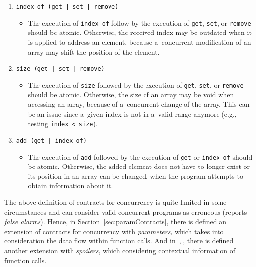 \begin{example}
\begin{enumerate}[label={$ (\varrho_{\arabic*}) $}]
        \item
            \texttt{index\_of (get | set | remove)}
            \begin{itemize}[label=]
                \item
                    The execution of \texttt{index\_of} follow by the execution
                    of \texttt{get}, \texttt{set}, or \texttt{remove} should be
                    atomic. Otherwise, the received index may be outdated when
                    it is applied to address an element, because a~concurrent
                    modification of
                    an array may shift the position of the element.
            \end{itemize}

        \item
            \texttt{size (get | set | remove)}
            \begin{itemize}[label=]
                \item
                    The execution of \texttt{size} followed by the execution of
                    \texttt{get}, \texttt{set}, or \texttt{remove} should be
                    atomic. Otherwise, the size of an array may be void when
                    accessing an array, because of a~concurrent change of the
                    array. This can be an issue since a~given index is not in
                    a~valid range anymore (e.g., testing \texttt{index < size}).
            \end{itemize}

        \item
            \texttt{add (get | index\_of)}
            \begin{itemize}[label=]
                \item
                    The execution of \texttt{add} followed by the execution of
                    \texttt{get} or \texttt{index\_of} should be atomic.
                    Otherwise, the added element does not have to longer exist
                    or its position in an array can be changed, when the program
                    attempts to obtain information about it.
            \end{itemize}
    \end{enumerate}
\end{example}

The above definition of contracts for concurrency is quite limited in
some circumstances and can consider valid concurrent programs as erroneous
(reports \emph{false alarms}). Hence, in Section~\ref{sec:paramContracts},
there is defined an extension of contracts for concurrency with
\emph{parameters}, which takes into consideration the data flow within
function calls. And in~\cite{contracts2017}, \cite{contracts2015}, there is
defined another extension with \emph{spoilers}, which considering contextual
information of function calls.


